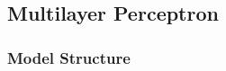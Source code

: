 \documentclass[12pt]{article}
\begin{document}

  \newpage\subsection{Multilayer Perceptron}

    \subsubsection{Model Structure}
    \quad
\end{document}
